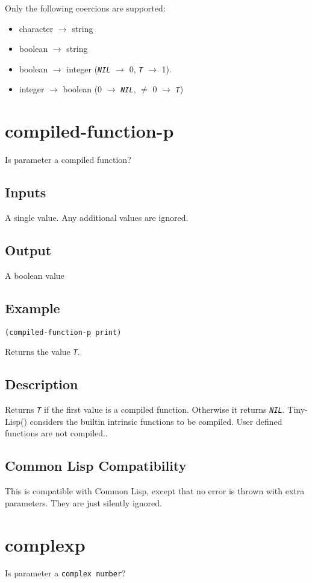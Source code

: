 \documentclass[10pt, openany]{book}
\newcommand{\constant}[1]{\emph{\texttt{#1}}}
\newcommand{\datatype}[1]{\texttt{#1}}
\newcommand{\tl}{Tiny-Lisp}
\newcommand{\cl}{Common Lisp}
\begin{document}
Only the following coercions are supported:
\begin{itemize}
  \item character $\rightarrow$ string
  \item boolean $\rightarrow$ string
  \item boolean $\rightarrow$ integer (\constant{NIL} $\rightarrow$ 0, \constant{T} $\rightarrow$ 1).
  \item integer $\rightarrow$ boolean (0 $\rightarrow$ \constant{NIL}, $\neq$ 0 $\rightarrow$ \constant{T})
\end{itemize}

\section{compiled-function-p}
Is parameter a compiled function?
\subsection{Inputs}
A single value.  Any additional values are ignored.
\subsection{Output}
A boolean value
\subsection{Example}
\begin{lstlisting}
(compiled-function-p print)
\end{lstlisting}
Returns the value \constant{T}.
\subsection{Description}
Returns \constant{T} if the first value is a compiled function.  Otherwise it returns \constant{NIL}.  \tl() considers the builtin intrinsic functions to be compiled.  User defined functions are not compiled..
\subsection{Common Lisp Compatibility}
This is compatible with \cl, except that no error is thrown with extra parameters.  They are just silently ignored.

\section{complexp}
Is parameter a \datatype{complex number}?
\end{document}

